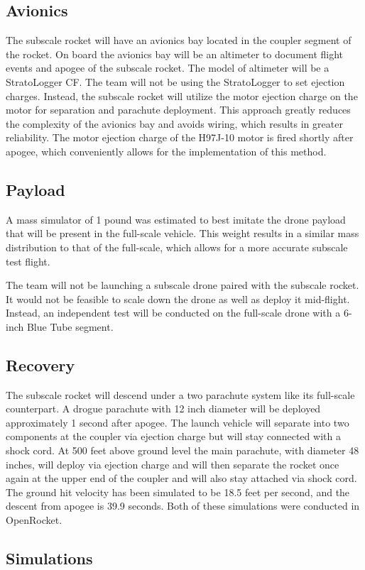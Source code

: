     \subsection{Avionics}
The subscale rocket will have an avionics bay located in the coupler segment of the rocket. On board the avionics bay will be an altimeter to document flight events and apogee of the subscale rocket. The model of altimeter will be a StratoLogger CF.
The team will not be using the StratoLogger to set ejection charges. Instead, the subscale rocket will utilize the motor ejection charge on the motor for separation and parachute deployment. This approach greatly reduces the complexity of the avionics bay and avoids wiring, which results in greater reliability. The motor ejection charge of the H97J-10 motor is fired shortly after apogee, which conveniently allows for the implementation of this method.

    \subsection{Payload}
 A mass simulator of 1 pound was estimated to best imitate the drone payload that will be present in the full-scale vehicle. This weight results in a similar mass distribution to that of the full-scale, which allows for a more accurate subscale test flight. 

The team will not be launching a subscale drone paired with the subscale rocket. It would not be feasible to scale down the drone as well as deploy it mid-flight. Instead, an independent test will be conducted on the full-scale drone with a 6-inch Blue Tube segment.
   
    \subsection{Recovery}
The subscale rocket will descend under a two parachute system like its full-scale counterpart. A drogue parachute with 12 inch diameter will be deployed approximately 1 second after apogee. The launch vehicle will separate into two components at the coupler via ejection charge but will stay connected with a shock cord. At 500 feet above ground level the main parachute, with diameter 48 inches, will deploy via ejection charge and will then separate the rocket once again at the upper end of the coupler and will also stay attached via shock cord. The ground hit velocity has been simulated to be 18.5 feet per second, and the descent from apogee is 39.9 seconds. Both of these simulations were conducted in OpenRocket. 

    \subsection{Simulations}
    
